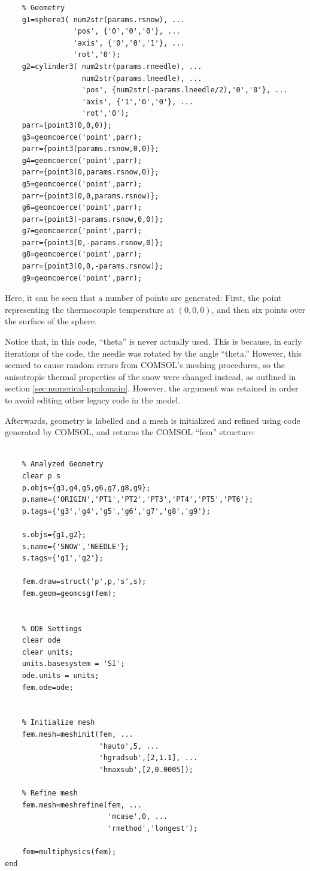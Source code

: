 \small
\begin{verbatim}
    % Geometry
    g1=sphere3( num2str(params.rsnow), ...
                'pos', {'0','0','0'}, ...
                'axis', {'0','0','1'}, ...
                'rot','0');
    g2=cylinder3( num2str(params.rneedle), ...
                  num2str(params.lneedle), ...
                  'pos', {num2str(-params.lneedle/2),'0','0'}, ...
                  'axis', {'1','0','0'}, ...
                  'rot','0');
    parr={point3(0,0,0)};
    g3=geomcoerce('point',parr);
    parr={point3(params.rsnow,0,0)};
    g4=geomcoerce('point',parr);
    parr={point3(0,params.rsnow,0)};
    g5=geomcoerce('point',parr);
    parr={point3(0,0,params.rsnow)};
    g6=geomcoerce('point',parr);
    parr={point3(-params.rsnow,0,0)};
    g7=geomcoerce('point',parr);
    parr={point3(0,-params.rsnow,0)};
    g8=geomcoerce('point',parr);
    parr={point3(0,0,-params.rsnow)};
    g9=geomcoerce('point',parr);
\end{verbatim}
\normalsize

Here, it can be seen that a number of points are generated: First, the point
representing the thermocouple temperature at \((0, 0, 0)\), and then six points
over the surface of the sphere.

Notice that, in this code, ``theta'' is never actually used. This is
because, in early iterations of the code, the needle was rotated by the angle
``theta.'' However, this seemed to cause random errors from COMSOL's meshing
procedures, so the anisotropic thermal properties of the snow were changed
instead, as outlined in section \ref{sec:numerical-np:domain}. However, the
argument was retained in order to avoid editing other legacy code in the model.

Afterwards, geometry is labelled and a mesh is initialized and refined using
code generated by COMSOL, and returns the COMSOL ``fem'' structure:

\small
\begin{verbatim}

    % Analyzed Geometry
    clear p s
    p.objs={g3,g4,g5,g6,g7,g8,g9};
    p.name={'ORIGIN','PT1','PT2','PT3','PT4','PT5','PT6'};
    p.tags={'g3','g4','g5','g6','g7','g8','g9'};

    s.objs={g1,g2};
    s.name={'SNOW','NEEDLE'};
    s.tags={'g1','g2'};

    fem.draw=struct('p',p,'s',s);
    fem.geom=geomcsg(fem);


    % ODE Settings
    clear ode
    clear units;
    units.basesystem = 'SI';
    ode.units = units;
    fem.ode=ode;


    % Initialize mesh
    fem.mesh=meshinit(fem, ...
                      'hauto',5, ...
                      'hgradsub',[2,1.1], ...
                      'hmaxsub',[2,0.0005]);

    % Refine mesh
    fem.mesh=meshrefine(fem, ...
                        'mcase',0, ...
                        'rmethod','longest');

    fem=multiphysics(fem);
end
\end{verbatim}
\normalsize

